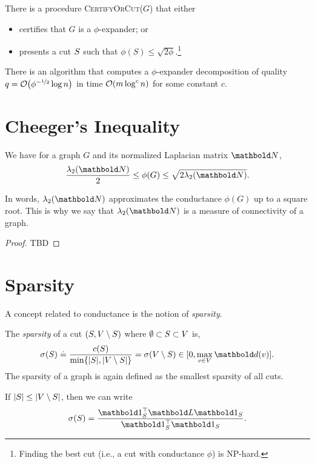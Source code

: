 \begin{thm}
There is a procedure \textsc{CertifyOrCut($G$)} that either \begin{itemize}
    \item certifies that $G$ is a $\phi$-expander; or
    \item presents a cut $S$ such that $\phi(S) \leq \sqrt{2\phi}$.\footnote{Finding the best cut (i.e., a cut with conductance $\phi$) is NP-hard.}
\end{itemize}
\end{thm}

\begin{thm}
There is an algorithm that computes a $\phi$-expander decomposition of quality $q = \LandauO{\phi^{-\nicefrac{1}{2}} \log n}$ in time $\LandauO{m \log^c n}$ for some constant $c$.
\end{thm}

\section{Cheeger's Inequality}

\begin{thm} We have for a graph $G$ and its normalized Laplacian matrix $\mN$, \begin{align}
    \frac{\lambda_2(\mN)}{2} \leq \phi(G) \leq \sqrt{2 \lambda_2(\mN)}.
\end{align}
\end{thm}\noindent In words, $\lambda_2(\mN)$ approximates the conductance $\phi(G)$ up to a square root. This is why we say that $\lambda_2(\mN)$ is a measure of connectivity of a graph.

\begin{proof}
TBD
\end{proof}

\section{Sparsity}

A concept related to conductance is the notion of \emph{sparsity}.

\begin{defn}[Sparsity] The \emph{sparsity} of a cut $(S, V \setminus S)$ where $\emptyset \subset S \subset V$ is, \begin{align}
    \sigma(\sS) \defeq \frac{c(\sS)}{\min\{|\sS|, |\sV \setminus \sS|\}} = \sigma(\sV \setminus \sS) \in [0, \max_{v \in \sV} \vd(v)].
\end{align} The sparsity of a graph is again defined as the smallest sparsity of all cuts.
\end{defn}
\begin{rmk}
If $|S| \leq |V \setminus S|$, then we can write \begin{align}
    \sigma(\sS) = \frac{\trans{\vOne_\sS}\mL\vOne_\sS}{\trans{\vOne_\sS}\vOne_\sS}.
\end{align}
\end{rmk}

